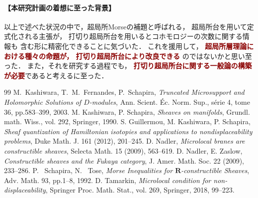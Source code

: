 \documentclass[11pt,a4paper,uplatex,dvipdfmx]{ujarticle} 		%
\newcommand{\研究課題名}{打切り超局所台の関手的性質の研究とMorse理論への応用}
\newcommand{\研究機関名}{北海道大学}
\newcommand{\研究代表者氏名}{大柴寿浩}
\begin{document}

\vspace{-16pt}
\paragraph{【本研究計画の着想に至った背景】}
以上で述べた状況の中で，超局所Morseの補題と呼ばれる，
超局所台を用いて定式化される主張が，
打切り超局所台を用いるとコホモロジーの次数に関する情報も
含む形に精密化できることに気づいた．
これを援用して，\textcolor{darkred}{
	\textbf{超局所層理論における種々の命題が，
	打切り超局所台により改良できる}
}のではないかと思い至った．
また，それを研究する過程でも，
\textcolor{darkred}{\textbf{打切り超局所台に関する一般論の構築が必要}}であると考えるに至った．

\begin{thebibliography}{99}
	{\small
	\vspace{-4pt}	
	 M.~Kashiwara, T.~M.~Fernandes, 
	P.~Schapira, 
	\textit{Truncated Microsupport and Holomorphic Solutions 
	of \(D\)-modules}, 
	Ann. Scient. \'Ec. Norm. Sup., s\'erie 4, tome 36, 
	pp.583--399, 2003.
	\vspace{-6pt}	
	 M. Kashiwara, P. Schapira, \emph{Sheaves on manifolds}, Grundl. math. Wiss., vol. 292, Springer, 1990.
	\vspace{-6pt}
	 S. Guillermou, M. Kashiwara, P. Schapira, \emph{Sheaf quantization of Hamiltonian isotopies and applications to nondisplaceability problems}, Duke Math. J. 161 (2012), 201--245.
	\vspace{-6pt}
	 D. Nadler, \emph{Microlocal branes are constructible sheaves}, Selecta Math. 15 (2009), 563--619.
	\vspace{-6pt}
	 D. Nadler, E. Zaslow, \emph{Constructible sheaves and the Fukaya category}, J. Amer. Math. Soc. 22 (2009), 233--286.
	\vspace{-6pt}
	 P.~ Schapira, N.~ Tose, 
    \textit{Morse Inequalities for \(\mathbf{R}\)-constructible Sheaves}, 
    Adv. Math. 93, pp.1--8, 1992. 
	\vspace{-10pt}
	 D. Tamarkin, \emph{Microlocal condition for non-displaceability}, Springer Proc. Math. Stat., vol. 269, Springer, 2018, 99--223.
	\vspace{-6pt}
	}
\end{thebibliography}
\end{document}
